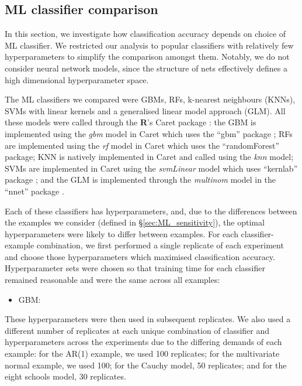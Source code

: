 \documentclass{article}
\begin{document}
\subsection{ML classifier comparison}\label{sec:ml_model}
In this section, we investigate how classification accuracy depends on choice of ML classifier. We restricted our analysis to popular classifiers with relatively few hyperparameters to simplify the comparison amongst them. Notably, we do not consider neural network models, since the structure of nets effectively defines a high dimensional hyperparameter space.

The ML classifiers we compared were GBMs, RFs, k-nearest neighbours (KNNs), SVMs with linear kernels and a generalised linear model approach (GLM). All these models were called through the \textbf{\textsf{R}}'s Caret package \citep{kuhn2008building}: the GBM is implemented using the \textit{gbm} model in Caret which uses the ``gbm'' package \citep{greenwell2019package}; RFs are implemented using the \textit{rf} model in Caret which uses the ``randomForest'' \citep{liaw2002classification} package; KNN is natively implemented in Caret and called using the \textit{knn} model; SVMs are implemented in Caret using the \textit{svmLinear} model which uses ``kernlab'' package \citep{karatzoglou2004kernlab}; and the GLM is implemented through the \textit{multinom} model in the ``nnet'' package \citep{ripley2016package}.

Each of these classifiers has hyperparameters, and, due to the differences between the examples we consider (defined in \S\ref{sec:ML_sensitivity}), the optimal hyperparameters were likely to differ between examples. For each classifier-example combination, we first performed a single replicate of each experiment and choose those hyperparameters which maximised classification accuracy. Hyperparameter sets were chosen so that training time for each classifier remained reasonable and were the same across all examples:

\begin{itemize}
	\item GBM: 
\end{itemize}


These hyperparameters were then used in subsequent replicates. We also used a different number of replicates at each unique combination of classifier and hyperparameters across the experiments due to the differing demands of each example: for the AR(1) example, we used 100 replicates; for the multivariate normal example, we used 100; for the Cauchy model, 50 replicates; and for the eight schools model, 30 replicates.
\end{document}
